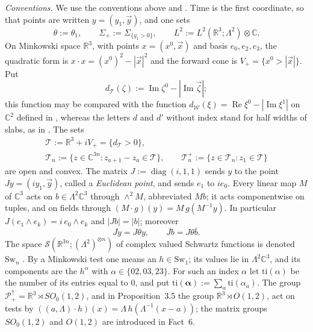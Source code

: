 \documentclass[11pt]{amsart}
\theoremstyle{definition}
\begin{document}
\emph{Conventions.}
We use the conventions above and \cite[(n1)--(n8)]{QEDIII}.
Time is the first coordinate, so that points are written $y=(y_1,\vec y)$, and one sets
\begin{equation*}
\theta:=\theta_1,\qquad \Sigma_+:=\Sigma_{\{y_1>0\}},\qquad L^2:=L^2(\mathbb R^3;\Lambda^2)\otimes\mathbb C.
\end{equation*}
On Minkowski space $\mathbb R^3$, with points $x=(x^0,\vec x)$ and basis $e_0,e_2,e_3$, the quadratic form is $x\cdot x=(x^0)^2-|\vec x|^2$ and the forward cone is $V_+=\{x^0>|\vec x|\}$.
Put
\begin{equation*}
d_{\mathcal T}(\zeta):=\operatorname{Im}\zeta^0-|\operatorname{Im}\vec\zeta|;
\end{equation*}
this function may be compared with the function $d_{\mathcal W}(\xi)=\allowbreak \operatorname{Re}\xi^0-|\operatorname{Im}\xi^1|$ on $\mathbb C^2$ defined in \cite[Section~14.2]{QEDII}, whereas the letters $d$ and $d'$ without index stand for half widths of slabs, as in \cite[Proposition~14.16]{QEDII}.
The sets
\begin{gather*}
\mathcal T:=\mathbb R^3+iV_+=\{d_{\mathcal T}>0\},\\
\mathcal T_n:=\{z\in\mathbb C^{3n}:z_{a+1}-z_a\in\mathcal T\},\qquad \mathcal T_n^+:=\{z\in\mathcal T_n:z_1\in\mathcal T\}
\end{gather*}
are open and convex.
The matrix $J:=\operatorname{diag}(i,1,1)$ sends $y$ to the point $Jy=(iy_1,\vec y)$, called a \emph{Euclidean point}, and sends $e_1$ to $ie_0$.
Every linear map $M$ of $\mathbb C^3$ acts on $b\in\Lambda^2\mathbb C^3$ through $\wedge^2M$, abbreviated $Mb$; it acts componentwise on tuples, and on fields through $(M\cdot g)(y)=M\,g(M^{-1}y)$.
In particular $J(e_1\wedge e_k)=i\,e_0\wedge e_k$ and $|Jb|=|b|$; moreover
\begin{equation}
\overline{Jy}=J\theta y,\qquad \overline{Jb}=J\theta\bar b.
\tag{K}
\end{equation}
The space $\mathcal S(\mathbb R^{3n};(\Lambda^2)^{\otimes n})$ of complex valued Schwartz functions is denoted $\mathrm{Sw}_n$ \cite[(n5)]{QEDIII}.
By a Minkowski test one means an $h\in\mathrm{Sw}_1$; its values lie in $\Lambda^2\mathbb C^3$, and its components are the $h^\alpha$ with $\alpha\in\{02,03,23\}$.
For such an index $\alpha$ let $\mathrm{ti}(\alpha)$ be the number of its entries equal to $0$, and put $\mathrm{ti}(\boldsymbol\alpha):=\sum_a\mathrm{ti}(\alpha_a)$.
The group $\mathcal P_+^\uparrow=\mathbb R^3\rtimes SO_0(1,2)$, and in Proposition~3.5 the group $\mathbb R^3\rtimes O(1,2)$, act on tests by $((a,\Lambda)\cdot h)(x)=\Lambda\,h(\Lambda^{-1}(x-a))$; the matrix groups $SO_0(1,2)$ and $O(1,2)$ are introduced in Fact~6.
\end{document}
